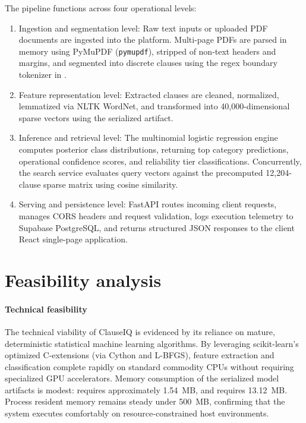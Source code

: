 The pipeline functions across four operational levels:
\begin{enumerate}
    \item Ingestion and segmentation level: Raw text inputs or uploaded PDF documents are ingested into the platform. Multi-page PDFs are parsed in memory using PyMuPDF (\texttt{pymupdf}), stripped of non-text headers and margins, and segmented into discrete clauses using the regex boundary tokenizer in .
    \item Feature representation level: Extracted clauses are cleaned, normalized, lemmatized via NLTK WordNet, and transformed into 40,000-dimensional sparse vectors using the serialized  artifact.
    \item Inference and retrieval level: The multinomial logistic regression engine computes posterior class distributions, returning top category predictions, operational confidence scores, and reliability tier classifications. Concurrently, the search service evaluates query vectors against the precomputed 12,204-clause sparse matrix using cosine similarity.
    \item Serving and persistence level: FastAPI routes incoming client requests, manages CORS headers and request validation, logs execution telemetry to Supabase PostgreSQL, and returns structured JSON responses to the client React single-page application.
\end{enumerate}

\section{Feasibility analysis}
\label{sec:feasibility_analysis}

\paragraph*{Technical feasibility}
The technical viability of ClauseIQ is evidenced by its reliance on mature, deterministic statistical machine learning algorithms. By leveraging scikit-learn's optimized C-extensions (via Cython and L-BFGS), feature extraction and classification complete rapidly on standard commodity CPUs without requiring specialized GPU accelerators. Memory consumption of the serialized model artifacts is modest:  requires approximately 1.54~MB, and  requires 13.12~MB. Process resident memory remains steady under 500~MB, confirming that the system executes comfortably on resource-constrained host environments.

